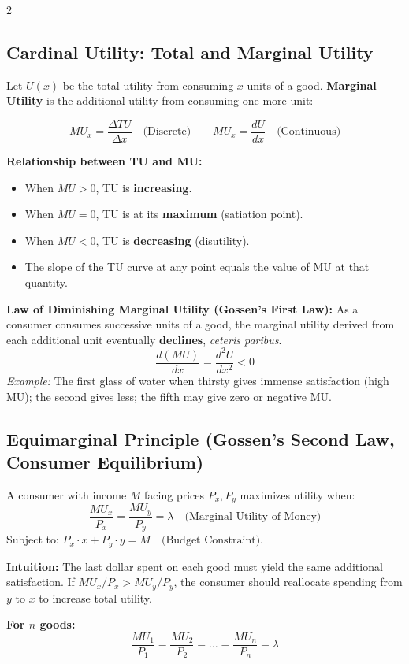\documentclass[10pt,a4paper]{article}
\begin{document}
\begin{multicols}{2}
\subsection*{Cardinal Utility: Total and Marginal Utility}

Let $U(x)$ be the total utility from consuming $x$ units of a good. \textbf{Marginal Utility} is the additional utility from consuming one more unit:

\[
MU_x = \frac{\Delta TU}{\Delta x} \quad \text{(Discrete)} \qquad MU_x = \frac{dU}{dx} \quad \text{(Continuous)}
\]

\textbf{Relationship between TU and MU:}
\begin{itemize}[leftmargin=*,nosep]
    \item When $MU > 0$, TU is \textbf{increasing}.
    \item When $MU = 0$, TU is at its \textbf{maximum} (satiation point).
    \item When $MU < 0$, TU is \textbf{decreasing} (disutility).
    \item The slope of the TU curve at any point equals the value of MU at that quantity.
\end{itemize}

\textbf{Law of Diminishing Marginal Utility (Gossen's First Law):}
As a consumer consumes successive units of a good, the marginal utility derived from each additional unit eventually \textbf{declines}, \textit{ceteris paribus}.
\[
\frac{d(MU)}{dx} = \frac{d^2 U}{dx^2} < 0
\]
\textit{Example:} The first glass of water when thirsty gives immense satisfaction (high MU); the second gives less; the fifth may give zero or negative MU.

\subsection*{Equimarginal Principle (Gossen's Second Law, Consumer Equilibrium)}

A consumer with income $M$ facing prices $P_x, P_y$ maximizes utility when:
\[
\frac{MU_x}{P_x} = \frac{MU_y}{P_y} = \lambda \quad \text{(Marginal Utility of Money)}
\]
Subject to: $P_x \cdot x + P_y \cdot y = M \quad \text{(Budget Constraint)}$.

\textbf{Intuition:} The last dollar spent on each good must yield the same additional satisfaction. If $MU_x/P_x > MU_y/P_y$, the consumer should reallocate spending from $y$ to $x$ to increase total utility.

\textbf{For $n$ goods:}
\[
\frac{MU_1}{P_1} = \frac{MU_2}{P_2} = \dots = \frac{MU_n}{P_n} = \lambda
\]


\end{multicols}
\end{document}
